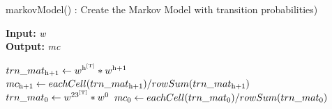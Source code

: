 \documentclass{article}
\begin{document}
\begin{algorithm}
\caption{markovModel() : Create the Markov Model with transition probabilities)}
\label{pseudoPSO}
\hspace*{\algorithmicindent} \textbf{Input:}  \textit{w} \\
\hspace*{\algorithmicindent} \textbf{Output:}  \textit{mc}
\begin{algorithmic}[1]
		\State $trn\_mat\textsubscript{h+1} \gets w\textsuperscript{h\textsuperscript{\text{[T]}}} * w\textsuperscript{h+1}$
		\State $mc\textsubscript{h+1} \gets eachCell(trn\_mat\textsubscript{h+1})/rowSum(trn\_mat\textsubscript{h+1})$
	\Else
		\State $trn\_mat\textsubscript{0} \gets w\textsuperscript{23\textsuperscript{\text{[T]}}} * w\textsuperscript{0}$
		\State $mc\textsubscript{0} \gets eachCell(trn\_mat\textsubscript{0})/rowSum(trn\_mat\textsubscript{0})$
	\EndIf
\EndFor



\end{algorithmic}
\end{algorithm}
\end{document}
